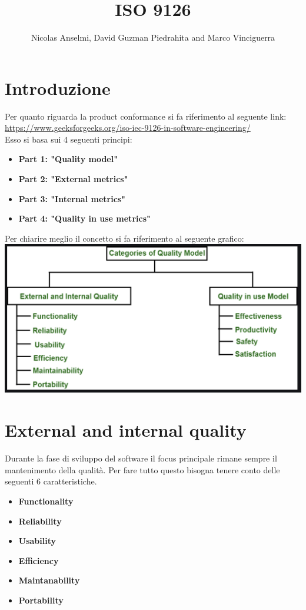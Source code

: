 \documentclass{article}
\title{ISO 9126}
\author{Nicolas Anselmi, David Guzman Piedrahita and Marco Vinciguerra}
\begin{document}
\maketitle
\section{Introduzione}
Per quanto riguarda la product conformance si fa riferimento al seguente link: \url{https://www.geeksforgeeks.org/iso-iec-9126-in-software-engineering/}
\\Esso si basa sui 4 seguenti principi:
\begin{itemize}
    \item \textbf{Part 1: "Quality model"} 
    \item \textbf{Part 2: "External metrics"} 
    \item \textbf{Part 3: "Internal metrics"} 
    \item \textbf{Part 4: "Quality in use metrics"} 
\end{itemize}
Per chiarire meglio il concetto si fa riferimento al seguente grafico:
\\\includegraphics[scale = 0.25]{"Immagini/ISO9126.PNG"}
\section{External and internal quality}
Durante la fase di sviluppo del software il focus principale rimane sempre il mantenimento della qualità.
Per fare tutto questo bisogna tenere conto delle seguenti 6 caratteristiche.
\begin{itemize}
    \item \textbf{Functionality} 
    \item \textbf{Reliability} 
    \item \textbf{Usability} 
    \item \textbf{Efficiency} 
    \item \textbf{Maintanability} 
    \item \textbf{Portability} 
\end{itemize}
\end{document}
